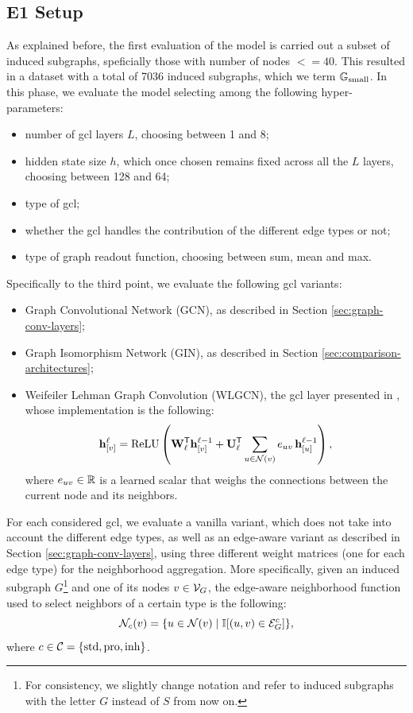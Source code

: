 \subsection{E1 Setup}
As explained before, the first evaluation of the model is carried out a subset of induced subgraphs, speficially those with number of nodes $<= 40$. This resulted in a dataset with a total of 7036 induced subgraphs, which we term $\mathbb{G}_{\mathrm{small}}$. In this phase, we evaluate the model selecting among the following hyper-parameters:
\begin{itemize}
    \item number of \gls{gcl} layers $L$, choosing between 1 and 8;
    \item hidden state size $h$, which once chosen remains fixed across all the $L$ layers, choosing between 128 and 64;
    \item type of \gls{gcl};
    \item whether the \gls{gcl} handles the contribution of the different edge types or not;
    \item type of graph readout function, choosing between sum, mean and max.
\end{itemize}
Specifically to the third point, we evaluate the following \gls{gcl} variants:
\begin{itemize}
    \item Graph Convolutional Network (GCN), as described in Section \ref{sec:graph-conv-layers};
    \item Graph Isomorphism Network (GIN), as described in Section \ref{sec:comparison-architectures};
    \item Weifeiler Lehman Graph Convolution (WLGCN), \ie the \gls{gcl} layer presented in \citep{morris2019weisfeilerlehmangoneural}, whose implementation is the following:
    $$\Elem{h}{v}^{\ell} = \Fun{ReLU}\Paren{\Matrix{W}_{\ell}^{\Transpose} \Elem{h}{v}^{\ell-1} + \Matrix{U}_{\ell}^{\Transpose} \sum_{u \in \Cal{N}(v)} e_{uv}\, \Elem{h}{u}^{\ell-1}},$$
    where $e_{uv} \in \mathbb{R}$ is a learned scalar that weighs the connections between the current node and its neighbors.
\end{itemize}
For each considered \gls{gcl}, we evaluate a vanilla variant, which does not take into account the different edge types, as well as an edge-aware variant as described in Section \ref{sec:graph-conv-layers}, using three different weight matrices (one for each edge type) for the neighborhood aggregation. More specifically, given an induced subgraph $G$\footnote{For consistency, we slightly change notation and refer to induced subgraphs with the letter $G$ instead of $S$ from now on.} and one of its nodes $v \in \Cal{V}_G$, the edge-aware neighborhood function used to select neighbors of a certain type is the following:
$$\Cal{N}_c(v) = \Set{u \in \Cal{N}(v) \mid \mathbb{I}[ (u,v) \in \Cal{E}_{G}^c]},$$
where $c \in \Cal{C} = \Set{\Fun{std}, \Fun{pro}, \Fun{inh}}$.

